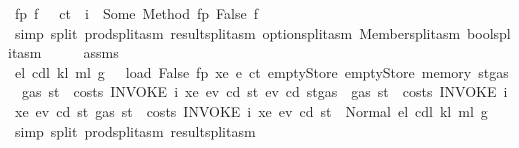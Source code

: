 \begin{isabellebody}
\ fp\ f\ \ {}{\isacharcolon}{\kern0pt}\ {\isachardoublequoteopen}ct\ {\isachardollar}{\kern0pt}{\isachardollar}{\kern0pt}\ i\ {\isacharequal}{\kern0pt}\ Some\ {\isacharparenleft}{\kern0pt}Method\ {\isacharparenleft}{\kern0pt}fp{\isacharcomma}{\kern0pt}\ False{\isacharcomma}{\kern0pt}\ f{\isacharparenright}{\kern0pt}{\isacharparenright}{\kern0pt}{\isachardoublequoteclose}\ \isamarkupfalse%
\ {\isacharparenleft}{\kern0pt}simp\ split{\isacharcolon}{\kern0pt}\ prod{\isachardot}{\kern0pt}split{\isacharunderscore}{\kern0pt}asm\ result{\isachardot}{\kern0pt}split{\isacharunderscore}{\kern0pt}asm\ option{\isachardot}{\kern0pt}split{\isacharunderscore}{\kern0pt}asm\ Member{\isachardot}{\kern0pt}split{\isacharunderscore}{\kern0pt}asm\ bool{\isachardot}{\kern0pt}split{\isacharunderscore}{\kern0pt}asm{\isacharparenright}{\kern0pt}\isanewline
\ \ \isamarkupfalse%
\ \isamarkupfalse%
\ assms\ {}\ {}\ {}\ \isamarkupfalse%
\ e\isactrlsub l\ cd\isactrlsub l\ k\isactrlsub l\ m\isactrlsub l\ g\ \ {}{\isacharcolon}{\kern0pt}\ {\isachardoublequoteopen}load\ False\ fp\ xe\ {\isacharparenleft}{\kern0pt}e{\isacharprime}{\kern0pt}\ ct{\isacharparenright}{\kern0pt}\ emptyStore\ emptyStore\ {\isacharparenleft}{\kern0pt}memory\ {\isacharparenleft}{\kern0pt}st{\isasymlparr}gas\ {\isacharcolon}{\kern0pt}{\isacharequal}{\kern0pt}\ gas\ st\ {\isacharminus}{\kern0pt}\ costs\ {\isacharparenleft}{\kern0pt}INVOKE\ i\ xe{\isacharparenright}{\kern0pt}\ ev\ cd\ st{\isasymrparr}{\isacharparenright}{\kern0pt}{\isacharparenright}{\kern0pt}\ ev\ cd\ {\isacharparenleft}{\kern0pt}st{\isasymlparr}gas\ {\isacharcolon}{\kern0pt}{\isacharequal}{\kern0pt}\ gas\ st\ {\isacharminus}{\kern0pt}\ costs\ {\isacharparenleft}{\kern0pt}INVOKE\ i\ xe{\isacharparenright}{\kern0pt}\ ev\ cd\ st{\isasymrparr}{\isacharparenright}{\kern0pt}\ {\isacharparenleft}{\kern0pt}gas\ st\ {\isacharminus}{\kern0pt}\ costs\ {\isacharparenleft}{\kern0pt}INVOKE\ i\ xe{\isacharparenright}{\kern0pt}\ ev\ cd\ st{\isacharparenright}{\kern0pt}\ {\isacharequal}{\kern0pt}\ Normal\ {\isacharparenleft}{\kern0pt}{\isacharparenleft}{\kern0pt}e\isactrlsub l{\isacharcomma}{\kern0pt}\ cd\isactrlsub l{\isacharcomma}{\kern0pt}\ k\isactrlsub l{\isacharcomma}{\kern0pt}\ m\isactrlsub l{\isacharparenright}{\kern0pt}{\isacharcomma}{\kern0pt}\ g{\isacharparenright}{\kern0pt}{\isachardoublequoteclose}\ \isamarkupfalse%
\ {\isacharparenleft}{\kern0pt}simp\ split{\isacharcolon}{\kern0pt}\ prod{\isachardot}{\kern0pt}split{\isacharunderscore}{\kern0pt}asm\ result{\isachardot}{\kern0pt}split{\isacharunderscore}{\kern0pt}asm{\isacharparenright}{\kern0pt}\isanewline

\end{isabellebody}
